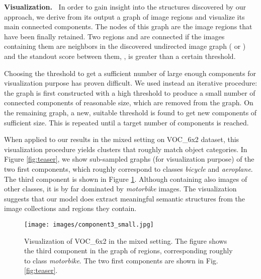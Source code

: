 \documentclass[10pt,twocolumn,letterpaper]{article}
\numberwithin{theorem}{section}
\newcommand{\parag}[1]{\vspace{4pt}\noindent\textbf{#1~}}
\begin{document}
\parag{Visualization.} 
In order to gain insight into the structures discovered by our approach, we derive from its output a graph of image regions and visualize its main connected components. The nodes of this graph are the image regions that have been finally retained. Two regions  and  are connected if the images containing them are neighbors in the discovered undirected image graph ( or ) and the standout score between them, , is greater than a certain threshold.
   
Choosing the threshold to get a sufficient number of large enough components for visualization purpose has proven difficult. We used instead an iterative procedure: the graph is first constructed with a high threshold to produce a small number of connected components of reasonable size, which are removed from the graph. On the remaining graph, a new, suitable threshold is found to get new components of sufficient size. This is repeated until a target number of components is reached. 

When applied to our results in the mixed setting on VOC\_6x2 dataset, this visualization procedure yields clusters that roughly match object categories. In Figure \ref{fig:teaser}, we show sub-sampled graphs (for visualization purpose) of the two first components, which roughly correspond to classes \textit{bicycle} and \textit{aeroplane}. The third component is shown in Figure \ref{fig:component3}. Although containing also images of other classes, it is by far dominated by \textit{motorbike} images. The visualization suggests that our model does extract meaningful semantic structures from the image collections and regions they contain.

\begin{figure}
\begin{center}
\texttt{[image: images/component3\_small.jpg]}
\end{center}
\vspace{-6mm}
\caption{\small Visualization of VOC\_6x2 in the mixed setting. The figure shows the third component in the graph of regions, corresponding roughly to class \textit{motorbike}. The two first components are shown in Fig.\ref{fig:teaser}.}
\label{fig:component3}
\vspace{-4mm}
\end{figure}



 
\end{document}
